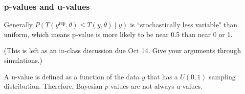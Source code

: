 \documentclass{beamer}
\begin{document}
\begin{frame}[fragile]
\frametitle{p-values and u-values}

Generally $P(T(y^{\text{rep}}, \theta) \le T(y, \theta) \mid y)$ is
``stochastically less variable" than uniform, which means p-value is
more likely to be near 0.5 than near 0 or 1.
\newline






(This is left as an in-class discussion due Oct 14. Give your arguments through
simulations.)
\newline

A u-value is defined as a function of the data $y$ that has a $U(0,1)$
sampling distribution. Therefore, Bayesian $p$-values are not always u-values.
\end{frame}
\end{document}
